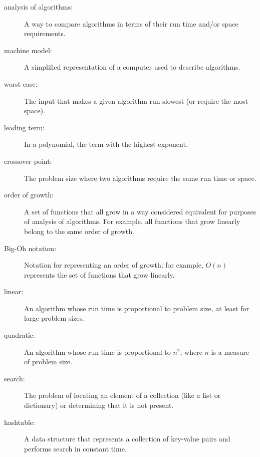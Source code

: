 \documentclass[10pt]{book}
\begin{document}
\begin{description}

\item[analysis of algorithms:] A way to compare algorithms in terms of
their run time and/or space requirements.

\item[machine model:] A simplified representation of a computer used
to describe algorithms.

\item[worst case:] The input that makes a given algorithm run slowest (or
require the most space).

\item[leading term:] In a polynomial, the term with the highest exponent.

\item[crossover point:] The problem size where two algorithms require
the same run time or space.

\item[order of growth:] A set of functions that all grow in a way
considered equivalent for purposes of analysis of algorithms.
For example, all functions that grow linearly belong to the same
order of growth.

\item[Big-Oh notation:] Notation for representing an order of growth;
for example, $O(n)$ represents the set of functions that grow
linearly.

\item[linear:] An algorithm whose run time is proportional to
problem size, at least for large problem sizes.

\item[quadratic:] An algorithm whose run time is proportional to
$n^2$, where $n$ is a measure of problem size.

\item[search:] The problem of locating an element of a collection
(like a list or dictionary) or determining that it is not present.

\item[hashtable:] A data structure that represents a collection of
key-value pairs and performs search in constant time.

\end{description}


\printindex

\clearemptydoublepage
\end{document}
